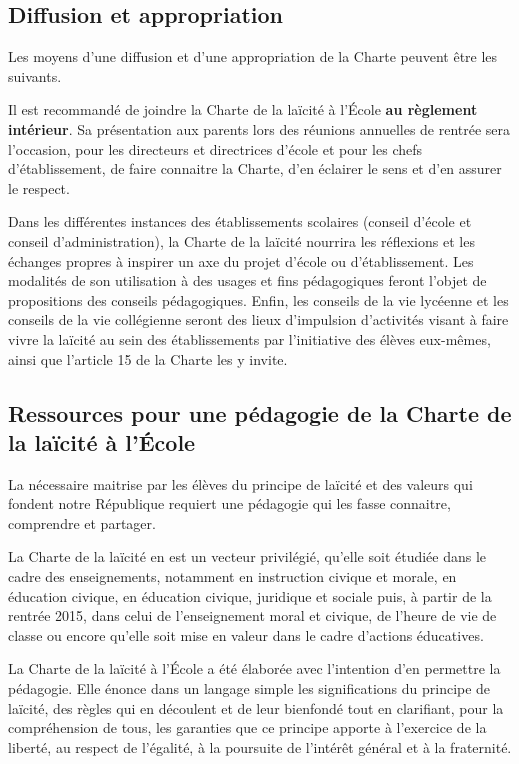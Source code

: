 \subsection{Diffusion et appropriation}
Les moyens d’une diffusion et d’une appropriation de la Charte peuvent être les suivants.

Il est recommandé de joindre la Charte de la laïcité à l’École \textbf{au règlement intérieur}. Sa présentation aux parents lors des réunions annuelles de rentrée sera l’occasion, pour les directeurs et directrices d’école et pour les chefs d’établissement, de faire connaitre la Charte, d’en éclairer le sens et d’en assurer le respect.

Dans les différentes instances des établissements scolaires (conseil d’école et conseil d’administration), la Charte de la laïcité nourrira les réflexions et les échanges propres à inspirer un axe du projet d’école ou d’établissement. Les modalités de son utilisation à des usages et fins pédagogiques feront l’objet de propositions des conseils pédagogiques. Enfin, les conseils de la vie lycéenne et les conseils de la vie collégienne seront des lieux d’impulsion d’activités visant à faire vivre la laïcité au sein des établissements par l’initiative des élèves eux-mêmes, ainsi que l’article 15 de la Charte les y invite.

\subsection{Ressources pour une pédagogie de la Charte de la laïcité à l’École}
La nécessaire maitrise par les élèves du principe de laïcité et des valeurs qui fondent notre République requiert une pédagogie qui les fasse connaitre, comprendre et partager.

La Charte de la laïcité en est un vecteur privilégié, qu’elle soit étudiée dans le cadre des enseignements, notamment en instruction civique et morale, en éducation civique, en éducation civique, juridique et sociale puis, à partir de la rentrée 2015, dans celui de l’enseignement moral et civique, de l’heure de vie de classe ou encore qu’elle soit mise en valeur dans le cadre d’actions éducatives.

La Charte de la laïcité à l’École a été élaborée avec l’intention d’en permettre la pédagogie. Elle énonce dans un langage simple les significations du principe de laïcité, des règles qui en découlent et de leur bienfondé tout en clarifiant, pour la compréhension de tous, les garanties que ce principe apporte à l’exercice de la liberté, au respect de l’égalité, à la poursuite de l’intérêt général et à la fraternité.

